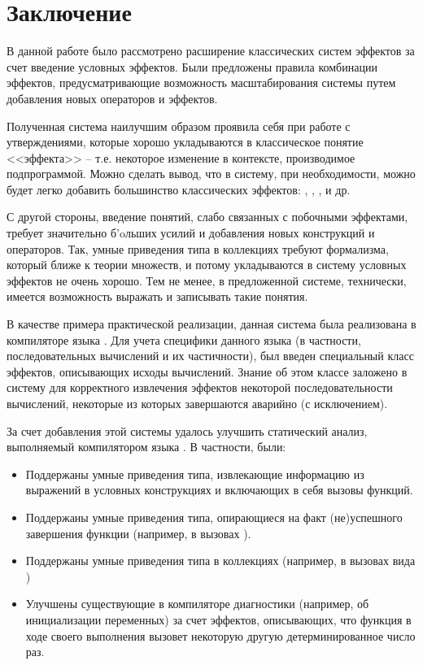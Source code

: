 \section*{Заключение}

В данной работе было рассмотрено расширение классических систем эффектов за счет введение условных эффектов. Были предложены правила комбинации эффектов, предусматривающие возможность масштабирования системы путем добавления новых операторов и эффектов. 

Полученная система наилучшим образом проявила себя при работе с утверждениями, которые хорошо укладываются в классическое понятие <<эффекта>> -- т.е. некоторое изменение в контексте, производимое подпрограммой. Можно сделать вывод, что в систему, при необходимости, можно будет легко добавить большинство классических эффектов: , , , и др. 

С другой стороны, введение понятий, слабо связанных с побочными эффектами, требует значительно б\a'{o}льших усилий и добавления новых конструкций и операторов. Так, умные приведения типа в коллекциях требуют формализма, который ближе к теории множеств, и потому укладываются в систему условных эффектов не очень хорошо. Тем не менее, в предложенной системе, технически, имеется возможность выражать и записывать такие понятия.

В качестве примера практической реализации, данная система была реализована в компиляторе языка . Для учета специфики данного языка (в частности, последовательных вычислений и их частичности), был введен специальный класс эффектов, описывающих исходы вычислений. Знание об этом классе заложено в систему для корректного извлечения эффектов некоторой последовательности вычислений, некоторые из которых завершаются аварийно (с исключением).

За счет добавления этой системы удалось улучшить статический анализ, выполняемый компилятором языка . В частности, были:

\begin{itemize}
	\item Поддержаны умные приведения типа, извлекающие информацию из выражений в условных конструкциях и включающих в себя вызовы функций.
	
	\item Поддержаны умные приведения типа, опирающиеся на факт (не)успешного завершения функции (например, в вызовах  ). 
	
	\item Поддержаны умные приведения типа в коллекциях (например, в вызовах вида )
	
	\item Улучшены существующие в компиляторе диагностики (например, об инициализации переменных) за счет эффектов, описывающих, что функция в ходе своего выполнения вызовет некоторую другую детерминированное число раз. 
\end{itemize}

